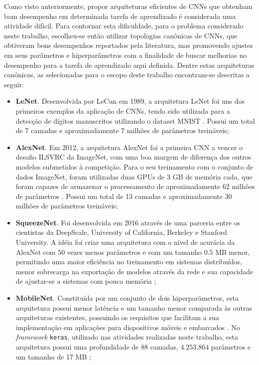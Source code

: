 
Como visto anteriormente, propor arquiteturas eficientes de CNNs que obtenham bom desempenho em determinada tarefa de aprendizado é considerada uma atividade difícil. Para contornar esta dificuldade, para o problema considerado neste trabalho, escolheu-se então utilizar topologias canônicas de CNNs, que obtiveram bons desempenhos reportados pela literatura, mas promovendo ajustes em seus parâmetros e hiperparâmetros com a finalidade de buscar melhorias  no desempenho para a tarefa de aprendizado aqui definida. Dentre estas arquiteturas canônicas, as selecionadas para o escopo deste trabalho encontram-se descritas a seguir:

\begin{itemize}
	\item \textbf{LeNet}. Desenvolvida por LeCun em 1989, a arquitetura LeNet foi uns dos primeiros exemplos da aplicação de CNNs, tendo sido utilizada para a detecção de dígitos manuscritos utilizando o dataset MNIST \cite{lecun}. Possui um total de 7 camadas e aproximadamente $7$ milhões de parâmetros treináveis;
	\item \textbf{AlexNet}. Em 2012, a arquitetura AlexNet foi a primeira CNN a vencer o desafio ILSVRC da ImageNet, com uma boa margem de diferença dos outros modelos submetidos à competição. Para o seu treinamento com o conjunto de dados ImageNet, foram utilizadas duas GPUs de 3 GB de memória cada, que foram capazes de armazenar o processamento de aproximadamente 62 milhões de parâmetros \cite{alexnet,khan}. Possui um total de 13 camadas e aproximadamente $30$ milhões de parâmetros treináveis;
	\item \textbf{SqueezeNet}. Foi desenvolvida em 2016 através de uma parceria entre os cientistas da DeepScale, University of California, Berkeley e Stanford University. A idéia foi criar uma arquitetura com o nível de acurácia da AlexNet com $50$ vezes menos parâmetros e com um tamanho $0.5$ MB menor, permitindo uma maior eficiência no treinamento em sistemas distribuídos, menor sobrecarga na exportação de modelos através da rede e sua capacidade de ajustar-se a sistemas com pouca memória \cite{squeezenet};
	\item \textbf{MobileNet}. Constituída por um conjunto de dois hiperparâmetros, esta arquitetura possui menor latência e um tamanho menor comparada às outras arquiteturas existentes, possuindo os requisitos que facilitam a sua implementação em aplicações para dispositivos móveis e embarcados \cite{mobilenet}. No \emph{framework} \texttt{keras}, utilizado nas atividades realizadas neste trabalho, esta arquitetura possui uma profundidade de $88$ camadas, $4.253.864$ parâmetros e um tamanho de 17 MB \cite{keras};

\end{itemize}
